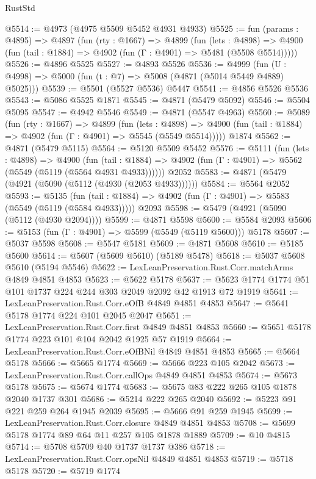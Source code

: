 \begin{lexlean}{RustStd}
\begin{coremodule}
{\begin{coremodule}
{{{{{{{{{{{{{{{{{{{{{{{{{{{{{@5514 := @4973 (@4975 @5509 @5452 @4931 @4933)
@5525 := fun (params : @4895) =>
  @4897
    (fun (rty : @1667) =>
    @4899
      (fun (lets : @4898) =>
      @4900 (fun (tail : @1884) => @4902 (fun (Γ : @4901) => @5481 (@5508 @5514)))))
@5526 := @4896 @5525
@5527 := @4893 @5526
@5536 := @4999 (fun (U : @4998) => @5000 (fun (t : @7) => @5008 (@4871 (@5014 @5449 @4889) @5025)))
@5539 := @5501 (@5527 @5536) @5447
@5541 := @4856 @5526 @5536
@5543 := @5086 @5525 @1871
@5545 := @4871 (@5479 @5092)
@5546 := @5504 @5095
@5547 := @4942 @5546
@5549 := @4871 (@5547 @4963)
@5560 := @5089
    (fun (rty : @1667) =>
    @4899
      (fun (lets : @4898) =>
      @4900 (fun (tail : @1884) => @4902 (fun (Γ : @4901) => @5545 (@5549 @5514)))))
    @1874
@5562 := @4871 (@5479 @5115)
@5564 := @5120 @5509 @5452
@5576 := @5111
    (fun (lets : @4898) =>
    @4900
      (fun (tail : @1884) => @4902 (fun (Γ : @4901) => @5562 (@5549 (@5119 (@5564 @4931 @4933))))))
    @2052
@5583 := @4871 (@5479 (@4921 (@5090 (@5112 (@4930 (@2053 @4933))))))
@5584 := @5564 @2052
@5593 := @5135
    (fun (tail : @1884) => @4902 (fun (Γ : @4901) => @5583 (@5549 (@5119 (@5584 @4933)))))
    @2093
@5598 := @5479 (@4921 (@5090 (@5112 (@4930 @2094))))
@5599 := @4871 @5598
@5600 := @5584 @2093
@5606 := @5153 (fun (Γ : @4901) => @5599 (@5549 (@5119 @5600))) @5178
@5607 := @5037 @5598
@5608 := @5547 @5181
@5609 := @4871 @5608
@5610 := @5185 @5600
@5614 := @5607 (@5609 @5610) (@5189 @5478)
@5618 := @5037 @5608 @5610 (@5194 @5546)
@5622 := LexLeanPreservation.Rust.Corr.matchArms @4849 @4851 @4853
@5623 := @5622 @5178
@5637 := @5623 @1774 @1774 @51 @101 @1737 @224 @244 @303 @2049 @2092 @42 @1913 @72 @1919
@5641 := LexLeanPreservation.Rust.Corr.eOfB @4849 @4851 @4853
@5647 := @5641 @5178 @1774 @224 @101 @2045 @2047
@5651 := LexLeanPreservation.Rust.Corr.first @4849 @4851 @4853
@5660 := @5651 @5178 @1774 @223 @101 @104 @2042 @1925 @57 @1919
@5664 := LexLeanPreservation.Rust.Corr.eOfBNil @4849 @4851 @4853
@5665 := @5664 @5178
@5666 := @5665 @1774
@5669 := @5666 @223 @105 @2042
@5673 := LexLeanPreservation.Rust.Corr.callOps @4849 @4851 @4853
@5674 := @5673 @5178
@5675 := @5674 @1774
@5683 := @5675 @83 @222 @265 @105 @1878 @2040 @1737 @301
@5686 := @5214 @222 @265 @2040
@5692 := @5223 @91 @221 @259 @264 @1945 @2039
@5695 := @5666 @91 @259 @1945
@5699 := LexLeanPreservation.Rust.Corr.closure @4849 @4851 @4853
@5708 := @5699 @5178 @1774 @89 @64 @11 @257 @105 @1878 @1889
@5709 := @10 @4815
@5714 := @5708 @5709 @40 @1737 @1737 @386
@5718 := LexLeanPreservation.Rust.Corr.opsNil @4849 @4851 @4853
@5719 := @5718 @5178
@5720 := @5719 @1774
}}}}}}}}}}}}}}}}}}}}}}}}}}}}}
\end{coremodule}}
\end{coremodule}
\end{lexlean}
